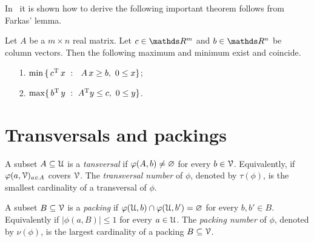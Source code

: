 \documentclass[sputnik.tex]{subfiles}
\begin{document}
In~\cite{GM} it is shown how to derive the following important theorem follows from Farkas' lemma.

\begin{proposition}
Let $A$ be a $m\times n$ real matrix. Let $c\in\RR^m$ and $b\in\RR^n$ be column vectors. Then the following maximum and minimum exist and coincide.\nobreak  
\begin{itemize}
\item[1.] $\min\,\{\,c^{\rm T}\, x\ :\ \ A\,x\ge b,\ 0\le x\}$;
\item[2.] $\max\{\,b^{\rm T}\,y\ :\ A^{\rm T}y\le c,\  0\le y\}$.\QED
\end{itemize}

\end{proposition}

% 
% 
% 
% 
% 
% 


\section{Transversals and packings}\label{Transversals_Packings}

A subset $A\subseteq\EuScript U$ is a \emph{tansversal\/} if $\varphi(A,b)\neq\varnothing$ for every $b\in\EuScript V$. Equivalently, if $\varphi(a,\EuScript V)_{a\in A}$ covers $\EuScript V$.
The \emph{transversal number\/} of $\phi$, denoted by $\tau(\phi)$, is the smallest cardinality of a transversal of $\phi$.

A subset $B\subseteq\EuScript V$ is a \emph{packing\/} if $\varphi(\EuScript U,b)\cap\varphi(\EuScript U,b')=\varnothing$ for every $b,b'\in B$. Equivalently if $|\phi(a,B)|\le1$ for every $a\in\EuScript U$.
The \emph{packing number\/} of $\phi$, denoted by $\nu(\phi)$, is the largest cardinality of a packing  $B\subseteq\EuScript V$.
\end{document}
